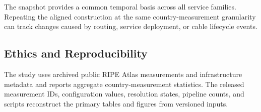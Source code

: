 The snapshot provides a common temporal basis across all service families.
Repeating the aligned construction at the same country-measurement
granularity can track changes caused by routing, service deployment, or
cable lifecycle events.

\subsection{Ethics and Reproducibility}
\label{subsec:ethics-reproducibility}

The study uses archived public RIPE Atlas measurements and infrastructure
metadata and reports aggregate country-measurement statistics. The released
measurement IDs, configuration values, resolution states, pipeline counts,
and scripts reconstruct the primary tables and figures from versioned inputs.